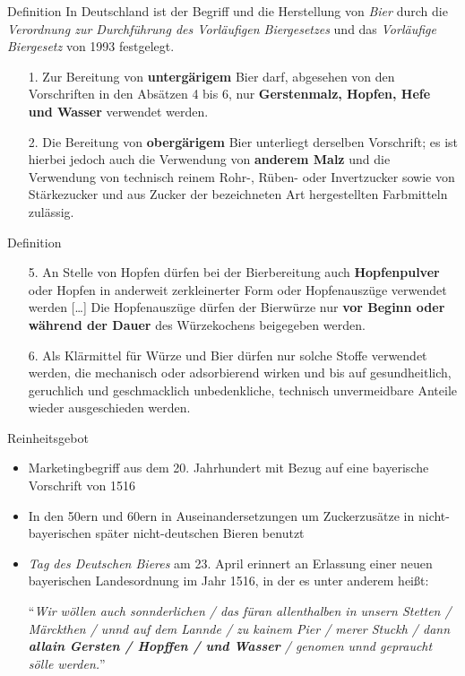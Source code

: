 \documentclass[9pt, ngerman]{beamer}
\begin{document}
\begin{frame}{Definition}
  In Deutschland ist der Begriff und die Herstellung von \emph{Bier} durch die
  \emph{Verordnung zur Durchführung des Vorläufigen Biergesetzes} und das
  \emph{Vorläufige Biergesetz} von 1993 festgelegt.

  \begin{enumerate}
    \item[1.] Zur Bereitung von \textbf{untergärigem} Bier darf, abgesehen von den
      Vorschriften in den Absätzen 4 bis 6, nur \textbf{Gerstenmalz, Hopfen, Hefe und
      Wasser} verwendet werden.
    \item[2.] Die Bereitung von \textbf{obergärigem} Bier unterliegt derselben
      Vorschrift; es ist hierbei jedoch auch die Verwendung von \textbf{anderem
      Malz} und die Verwendung von technisch reinem Rohr-, Rüben- oder
      Invertzucker sowie von Stärkezucker und aus Zucker der bezeichneten Art
      hergestellten Farbmitteln zulässig.
  \end{enumerate}
\end{frame}
\begin{frame}{Definition}
  \begin{enumerate}
    \item[5.] An Stelle von Hopfen dürfen bei der Bierbereitung auch
      \textbf{Hopfenpulver} oder Hopfen in anderweit zerkleinerter Form oder
      Hopfenauszüge verwendet werden [\dots] Die Hopfenauszüge dürfen der
      Bierwürze nur \textbf{vor Beginn oder während der Dauer} des Würzekochens
      beigegeben werden.

    \item[6.] Als Klärmittel für Würze und Bier dürfen nur solche Stoffe
      verwendet werden, die mechanisch oder adsorbierend wirken und bis auf
      gesundheitlich, geruchlich und geschmacklich unbedenkliche, technisch
      unvermeidbare Anteile wieder ausgeschieden werden.
  \end{enumerate}
\end{frame}
\begin{frame}{Reinheitsgebot}
  \begin{itemize}
    \item Marketingbegriff aus dem 20. Jahrhundert mit Bezug auf eine
      bayerische Vorschrift von 1516
    \item In den 50ern und 60ern in Auseinandersetzungen um Zuckerzusätze
      in nicht-bayerischen später nicht-deutschen Bieren benutzt
    \item \emph{Tag des Deutschen Bieres} am 23. April erinnert an Erlassung
      einer neuen bayerischen Landesordnung im Jahr 1516, in der es unter
      anderem heißt:

      \enquote{\emph{Wir wöllen auch sonnderlichen / das füran
      allenthalben in unsern Stetten / Märckthen / unnd auf dem Lannde / zu
      kainem Pier / merer Stuckh / dann \textbf{allain Gersten / Hopffen / und
      Wasser} /
      genomen unnd gepraucht sölle werden.}}
  \end{itemize}
\end{frame}
\end{document}
